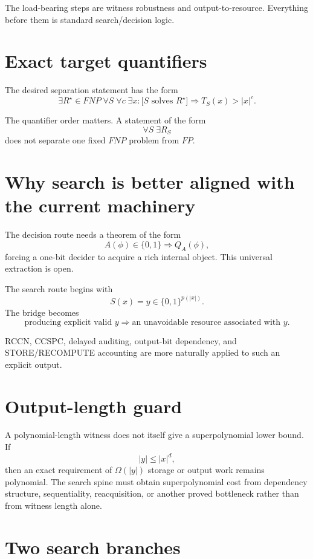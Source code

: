 \documentclass[11pt]{article}
\begin{document}
The load-bearing steps are witness robustness and output-to-resource. Everything before them is
standard search/decision logic.

\section{Exact target quantifiers}

The desired separation statement has the form
\[
\boxed{
\exists R^\star\in FNP\;
\forall S\;
\forall c\;
\exists x:
\bigl[S\text{ solves }R^\star\bigr]
\Longrightarrow
T_S(x)>|x|^c.
}
\]

The quantifier order matters. A statement of the form
\[
\forall S\;\exists R_S
\]
does not separate one fixed \(FNP\) problem from \(FP\).

\section{Why search is better aligned with the current machinery}

The decision route needs a theorem of the form
\[
A(\phi)\in\{0,1\}
\Longrightarrow
Q_A(\phi),
\]
forcing a one-bit decider to acquire a rich internal object. This universal extraction is open.

The search route begins with
\[
S(x)=y\in\{0,1\}^{p(|x|)}.
\]
The bridge becomes
\[
\boxed{
\text{producing explicit valid }y
\Longrightarrow
\text{an unavoidable resource associated with }y.
}
\]

RCCN, CCSPC, delayed auditing, output-bit dependency, and STORE/RECOMPUTE accounting are more
naturally applied to such an explicit output.

\section{Output-length guard}

\begin{warningbox}
A polynomial-length witness does not itself give a superpolynomial lower bound. If
\[
|y|\le |x|^d,
\]
then an exact requirement of \(\Omega(|y|)\) storage or output work remains polynomial. The search
spine must obtain superpolynomial cost from dependency structure, sequentiality, reacquisition, or
another proved bottleneck rather than from witness length alone.
\end{warningbox}

\section{Two search branches}
\end{document}

